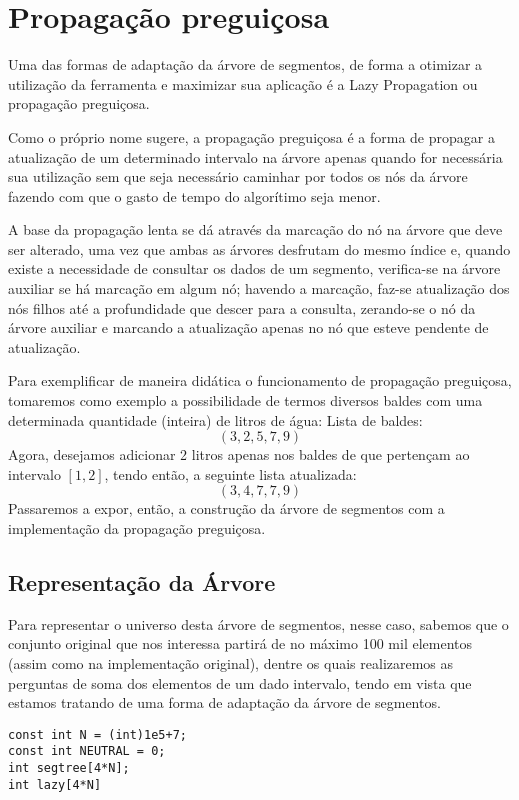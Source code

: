 \chapter{Propagação preguiçosa}
\label{cap:lazy}

Uma das formas de adaptação da árvore de segmentos, de forma a otimizar a utilização da ferramenta e maximizar sua aplicação é a Lazy Propagation ou propagação preguiçosa.

Como o próprio nome sugere, a propagação preguiçosa é a forma de propagar a atualização de um determinado intervalo na árvore apenas quando for necessária sua utilização sem que seja necessário caminhar por todos os nós da árvore fazendo com que o gasto de tempo do algorítimo seja menor.

A base da propagação lenta se dá através da marcação do nó na árvore que deve ser alterado, uma vez que ambas as árvores desfrutam do mesmo índice e, quando existe a necessidade de consultar os dados de um segmento, verifica-se na árvore auxiliar se há marcação em algum nó; havendo a marcação, faz-se atualização dos nós filhos até a profundidade que descer para a consulta, zerando-se o nó da árvore auxiliar e marcando a atualização apenas no nó que esteve pendente de atualização.

Para exemplificar de maneira didática o funcionamento de propagação preguiçosa, tomaremos como exemplo a possibilidade de termos diversos baldes com uma determinada quantidade (inteira) de litros de água:
Lista de baldes:
$$(3, 2, 5, 7, 9)$$
Agora, desejamos adicionar 2 litros apenas nos baldes de que pertençam ao intervalo $[1, 2]$, tendo então, a seguinte lista atualizada:
$$(3, 4, 7, 7, 9)$$
Passaremos a expor, então, a construção da árvore de segmentos com a implementação da propagação preguiçosa.

\section{Representação da Árvore}

Para representar o universo desta árvore de segmentos, nesse caso, sabemos que o conjunto original que nos interessa partirá de no máximo 100 mil elementos (assim como na implementação original), dentre os quais realizaremos as perguntas de soma dos elementos de um dado intervalo, tendo em vista que estamos tratando de uma forma de adaptação da árvore de segmentos.

\begin{lstlisting}
const int N = (int)1e5+7;
const int NEUTRAL = 0;
int segtree[4*N];
int lazy[4*N]
\end{lstlisting}

